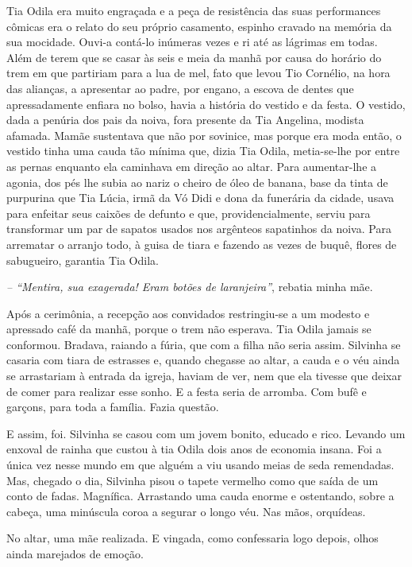 Tia Odila era muito engraçada e a peça de resistência das suas performances cômicas era o relato do seu próprio casamento, espinho cravado na memória da sua mocidade.
Ouvi-a contá-lo inúmeras vezes e ri até as lágrimas em todas.
Além de terem que se casar às seis e meia da manhã por causa do horário do trem em que partiriam para a lua de mel, fato que levou Tio Cornélio, na hora das alianças, a apresentar ao padre, por engano, a escova de dentes que apressadamente enfiara no bolso, havia a história do vestido e da festa.
O vestido, dada a penúria dos pais da noiva, fora presente da Tia Angelina, modista afamada.
Mamãe sustentava que não por sovinice, mas porque era moda então, o vestido tinha uma cauda tão mínima que, dizia Tia Odila, metia-se-lhe por entre as pernas enquanto ela caminhava em direção ao altar.
Para aumentar-lhe a agonia, dos pés lhe subia ao nariz o cheiro de óleo de banana, base da tinta de purpurina que Tia Lúcia, irmã da Vó Didi e dona da funerária da cidade, usava para enfeitar seus caixões de defunto e que, providencialmente, serviu para transformar um par de sapatos usados nos argênteos sapatinhos da noiva.
Para arrematar o arranjo todo, à guisa de tiara e fazendo as vezes de buquê, flores de sabugueiro, garantia Tia Odila.

{\itshape\small -- ``Mentira, sua exagerada! Eram botões de laranjeira''}, rebatia minha mãe.

Após a cerimônia, a recepção aos convidados restringiu-se a um modesto e apressado café da manhã, porque o trem não esperava.
Tia Odila jamais se conformou.
Bradava, raiando a fúria, que com a filha não seria assim.
Silvinha se casaria com tiara de estrasses e, quando chegasse ao altar, a cauda e o véu ainda se arrastariam à entrada da igreja, haviam de ver, nem que ela tivesse que deixar de comer para realizar esse sonho.
E a festa seria de arromba.
Com bufê e garçons, para toda a família.
Fazia questão.

E assim, foi.
Silvinha se casou com um jovem bonito, educado e rico.
Levando um enxoval de rainha que custou à tia Odila dois anos de economia insana.
Foi a única vez nesse mundo em que alguém a viu usando meias de seda remendadas.
Mas, chegado o dia, Silvinha pisou o tapete vermelho como que saída de um conto de fadas.
Magnífica.
Arrastando uma cauda enorme e ostentando, sobre a cabeça, uma minúscula coroa a segurar o longo véu.
Nas mãos, orquídeas.


No altar, uma mãe realizada.
E vingada, como confessaria logo depois, olhos ainda marejados de emoção.

